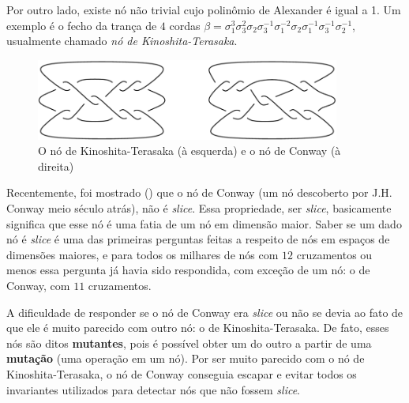 	\par\vspace{0.3cm} Por outro lado, existe nó não trivial cujo polinômio de Alexander é igual a 1. 
	Um exemplo é o fecho da trança de $4$ cordas 
	$\beta = \sigma_1^3\sigma_3^2\sigma_2\sigma_3^{-1}\sigma_1^{-2}\sigma_2
	\sigma_1^{-1}\sigma_3^{-1}\sigma_2^{-1}$, usualmente chamado \textit{nó de Kinoshita-Terasaka}.
	\begin{figure}[H]
	\label{no Kinoshita Terasaka}
		\begin{center}
			\includegraphics[width=10cm]{Images/The-Kinoshita-Terasaka-knot-left-and-Conway-mutant-right.png}
			\caption{O nó de Kinoshita-Terasaka (à esquerda) e o nó de Conway (à direita)}
		\end{center}
	\end{figure}
	Recentemente, foi mostrado (\cite{Piccirillo}) que o nó de Conway (um nó descoberto por J.H. Conway 
	meio século atrás), não é \textit{slice}. Essa propriedade, ser \textit{slice}, basicamente 
	significa que esse nó é uma fatia de um nó em dimensão maior. Saber se um dado nó é \textit{slice} 
	é uma das primeiras perguntas feitas a respeito de nós em espaços de dimensões maiores, e para 
	todos os milhares de nós com $12$ cruzamentos ou menos essa pergunta já havia sido respondida, 
	com exceção de um nó: o de Conway, com $11$ cruzamentos.
	
	\par\vspace{0.3cm} A dificuldade de responder se o nó de Conway era \textit{slice} ou 
	não se devia ao fato de que ele é muito parecido com outro nó: o de Kinoshita-Terasaka. 
	De fato, esses nós são ditos \textbf{mutantes}, pois é possível obter um do outro a 
	partir de uma \textbf{mutação} (uma operação em um nó). Por ser muito parecido com o 
	nó de Kinoshita-Terasaka, o nó de Conway conseguia escapar e evitar todos os invariantes 
	utilizados para detectar nós que não fossem \textit{slice}. 
	

